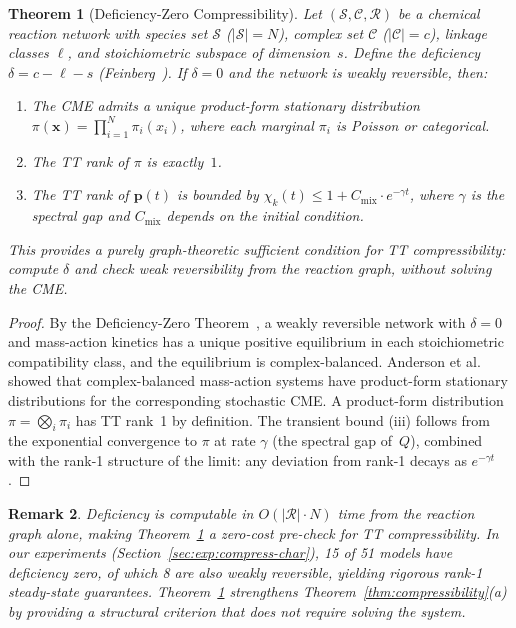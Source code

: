 \documentclass[11pt]{article}
\newtheorem{theorem}{Theorem}
\newtheorem{remark}[theorem]{Remark}
\begin{document}
\begin{theorem}[Deficiency-Zero Compressibility]\label{thm:deficiency}
Let $(\mathcal{S}, \mathcal{C}, \mathcal{R})$ be a chemical reaction network
with species set $\mathcal{S}$ ($|\mathcal{S}| = N$), complex set
$\mathcal{C}$ ($|\mathcal{C}| = c$), linkage classes $\ell$, and
stoichiometric subspace of dimension~$s$.
Define the \emph{deficiency} $\delta = c - \ell - s$
(Feinberg~\cite{feinberg1972,feinberg1979}).
If $\delta = 0$ and the network is weakly reversible, then:
\begin{enumerate}[label=(\roman*)]
\item The CME admits a unique product-form stationary distribution
  $\pi(\mathbf{x}) = \prod_{i=1}^N \pi_i(x_i)$, where each marginal
  $\pi_i$ is Poisson or categorical.
\item The TT rank of $\pi$ is exactly~$1$.
\item The TT rank of $\mathbf{p}(t)$ is bounded by
  $\chi_k(t) \leq 1 + C_{\mathrm{mix}} \cdot e^{-\gamma t}$,
  where $\gamma$ is the spectral gap and $C_{\mathrm{mix}}$ depends on
  the initial condition.
\end{enumerate}
This provides a purely graph-theoretic sufficient condition for TT
compressibility: compute $\delta$ and check weak reversibility from the
reaction graph, without solving the CME.
\end{theorem}

\begin{proof}
By the Deficiency-Zero Theorem~\cite{feinberg1972}, a weakly reversible
network with $\delta = 0$ and mass-action kinetics has a unique
positive equilibrium in each stoichiometric compatibility class,
and the equilibrium is complex-balanced.
Anderson et al.~\cite{anderson2010} showed that complex-balanced
mass-action systems have product-form stationary distributions for
the corresponding stochastic CME.
A product-form distribution $\pi = \bigotimes_i \pi_i$ has TT rank~1
by definition.
The transient bound (iii) follows from the exponential convergence
to $\pi$ at rate $\gamma$ (the spectral gap of~$Q$), combined with
the rank-1 structure of the limit: any deviation from rank-1 decays
as $e^{-\gamma t}$.
\end{proof}

\begin{remark}
Deficiency is computable in $O(|\mathcal{R}| \cdot N)$ time from the
reaction graph alone, making Theorem~\ref{thm:deficiency} a
zero-cost pre-check for TT compressibility.
In our experiments (Section~\ref{sec:exp:compress-char}), 15 of
51 models have deficiency zero, of which 8 are also weakly reversible,
yielding rigorous rank-1 steady-state guarantees.
Theorem~\ref{thm:deficiency} strengthens Theorem~\ref{thm:compressibility}(a)
by providing a \emph{structural} criterion that does not require
solving the system.
\end{remark}
\end{document}
